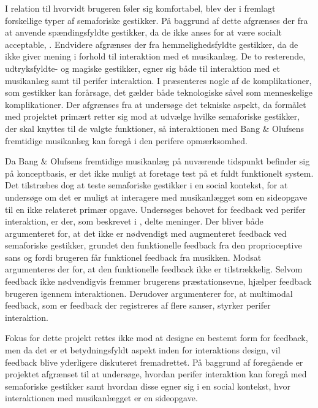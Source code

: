 I relation til hvorvidt brugeren føler sig komfortabel, blev der i  fremlagt forskellige typer af semaforiske gestikker. På baggrund af dette afgrænses der fra at anvende spændingsfyldte gestikker, da de ikke anses for at være socialt acceptable, \parencite[s. 277]{PDF:WouldYouDoThat}. Endvidere afgrænses der fra hemmelighedsfyldte gestikker, da de ikke giver mening i forhold til interaktion med et musikanlæg. De to resterende, udtryksfyldte- og magiske gestikker, egner sig både til interaktion med et musikanlæg samt til perifer interaktion.\blankline
%
I  præsenteres nogle af de komplikationer, som gestikker kan forårsage, det gælder både teknologiske såvel som menneskelige komplikationer. Der afgrænses fra at undersøge det tekniske aspekt, da formålet med projektet primært retter sig mod at udvælge hvilke semaforiske gestikker, der skal knyttes til de valgte funktioner, så interaktionen med Bang $\&$ Olufsens fremtidige musikanlæg kan foregå i den perifere opmærksomhed.

Da Bang $\&$ Olufsens fremtidige musikanlæg på nuværende tidspunkt befinder sig på konceptbasis, er det ikke muligt at foretage test på et fuldt funktionelt system. Det tilstræbes dog at teste semaforiske gestikker i en social kontekst, for at undersøge om det er muligt at interagere med musikanlægget som en sideopgave til en ikke relateret primær opgave.\blankline
%
Undersøges behovet for feedback ved perifer interaktion, er der, som beskrevet i , delte meninger. Der bliver både argumenteret for, at det ikke er nødvendigt med augmenteret feedback ved semaforiske gestikker, grundet den funktionelle feedback fra den proprioceptive sans og fordi brugeren får funktionel feedback fra musikken. Modsat argumenteres der for, at den funktionelle feedback ikke er tilstrækkelig. Selvom feedback ikke nødvendigvis fremmer brugerens præstationsevne, hjælper feedback brugeren igennem interaktionen. Derudover argumenterer \textcite[s. 21]{PDF:FacilitatingPIDesignAndEvaluation} for, at multimodal feedback, som er feedback der registreres af flere sanser, styrker perifer interaktion. 

Fokus for dette projekt rettes ikke mod at designe en bestemt form for feedback, men da det er et betydningsfyldt aspekt inden for interaktions design, vil feedback blive yderligere diskuteret fremadrettet.\blankline
%
På baggrund af foregående er projektet afgrænset til at undersøge, hvordan perifer interaktion kan foregå med semaforiske gestikker samt hvordan disse egner sig i en social kontekst, hvor interaktionen med musikanlægget er en sideopgave. 
